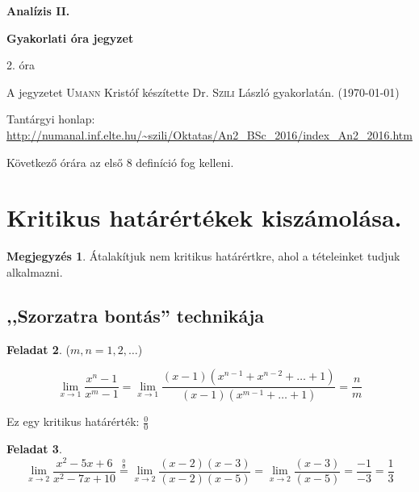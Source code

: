 \documentclass[a4paper,11.5pt]{article}
\begin{document}
	\setlength\parindent{0pt}
	\def\s{\hspace{0.2mm}\vphantom{\beta}}
	\def\Z{\mathbb{Z}}
	\def\Q{\mathbb{Q}}
	\def\R{\mathbb{R}}
	\def\C{\mathbb{C}}
	\def\N{\mathbb{N}}
	\def\Rn{\mathbb{R}^{n}}
	\def\Ra{\overline{\mathbb{R}}}
	\def\sume{\displaystyle\sum_{n=1}^{+\infty}}
	\def\sumn{\displaystyle\sum_{n=0}^{+\infty}}
	\def\biz{\emph{Bizonyítás:\ }}
	\def\narrow{\underset{n\rightarrow+\infty}{\longrightarrow}}
	\def\limn{\displaystyle\lim_{n\to +\infty}}
	\def\limx{\displaystyle\lim_{x\to +\infty}}
	
	\theoremstyle{definition}
	\newtheorem{theorem}{Tétel}[subsection] %
	
	\theoremstyle{definition}
	\newtheorem{definition}[theorem]{Definíció} %
	\newtheorem{example}[theorem]{Példa} %
	\newtheorem{task}[theorem]{Feladat} %
	\newtheorem{note}[theorem]{Megjegyzés} %
	\newtheorem{revision}[theorem]{Emlékeztető} %
	\begin{center}
		{\LARGE \textbf{Analízis II.}}
		
		{\large \textbf{Gyakorlati óra jegyzet}}
		
		2. óra
	\end{center}
	A jegyzetet \textsc{Umann} Kristóf készítette Dr. \textsc{Szili} László gyakorlatán. (\today)
	
	Tantárgyi honlap: \url{http://numanal.inf.elte.hu/~szili/Oktatas/An2_BSc_2016/index_An2_2016.htm}
	\bigskip
	
	Következő órára az első 8 definíció fog kelleni.
	\section{Kritikus határértékek kiszámolása.}
	\begin{note}
		Átalakítjuk nem kritikus határértkre, ahol a tételeinket tudjuk alkalmazni.
	\end{note}
	\subsection{,,Szorzatra bontás'' technikája}
	\begin{task}
		 ($m,n=1,2,\ldots$)
		
		\[ \lim_{x\to1}\frac{x^n-1}{x^m-1}=\lim_{x\to1}\frac{(x-1)(x^{n-1}+x^{n-2}+\ldots+1)}{(x-1)(x^{m-1}+\ldots+1)}=\frac{n}{m} \]
		
		Ez egy kritikus határérték: $\frac{0}{0}$
	\end{task}
	\begin{task}
		\[ \lim_{x\to2}\frac{x^2-5x+6}{x^2-7x+10}\overset{\frac{0}{0}}{=}\lim_{x\to2}\frac{(x-2)(x-3)}{(x-2)(x-5)}=\lim_{x\to2}\frac{(x-3)}{(x-5)}=\frac{-1}{-3}=\frac{1}{3} \]
	\end{task}
\end{document}

